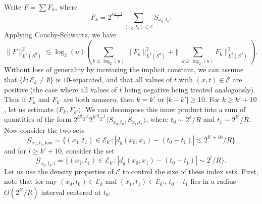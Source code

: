 Write $F = \sum F_k$, where
%
\[ F_k = 2^{k \frac{d-1}{2}} \sum_{(x_0,t_0) \in \mathcal{E}} {S\!}_{x_0,t_0}. \]
%
Applying Cauchy-Schwartz, we have
%
\[ \| F \|_{L^2(S^d)}^2 \lesssim \log_2(u) \left( \sum_{k \lesssim \log_2(u)} \| F_k \|_{L^2(S^d)}^2 + \| \sum_{k \gtrsim \log_2(u)} F_k \|_{L^2(S^d)}^2 \right). \]
%
Without loss of generality by increasing the implicit constant, we can assume that $\{ k : \mathcal{E}_k \neq \emptyset \}$ is $10$-separated, and that all values of $t$ with $(x,t) \in \mathcal{E}$ are positive (the case where all values of $t$ being negative being treated analogously). Thus if $F_k$ and $F_{k'}$ are both nonzero, then $k = k'$ or $|k - k'| \geq 10$. For $k \geq k' + 10$, let us estimate $\langle F_k, F_{k'} \rangle$. We can decompose this inner product into a sum of quantities of the form $2^{k \frac{d-1}{2}} 2^{k' \frac{d-1}{2}} \langle {S\!}_{x_0,t_0}, {S\!}_{x_1,t_1} \rangle$, where $t_0 \sim 2^k / R$ and $t_1 \sim 2^{k'} / R$. Now consider the two sets
%
\[ \mathcal{G}_{x_0,t_0,\text{low}} = \{ (x_1,t_1) \in \mathcal{E}_{k'} : |d_g(x_0,x_1) - (t_0 - t_1)| \lesssim 2^{k' + 10} / R \} \]
%
and for $l \geq k' + 10$, consider the set
%
\[ \mathcal{G}_{x_0,t_0,l} = \{ (x_1,t_1) \in \mathcal{E}_{k'} : |d_g(x_0,x_1) - (t_0 - t_1)| \sim 2^l / R \}. \]
%
Let us use the density properties of $\mathcal{E}$ to control the size of these index sets. First, note that for any $(x_0,t_0) \in \mathcal{E}_k$ and $(x_1,t_1) \in \mathcal{E}_{k'}$, $t_0 - t_1$ lies in a radius $O(2^{k'} / R)$ interval centered at $t_0$:
%
